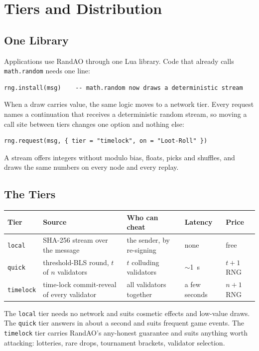 \section{Tiers and Distribution}\label{sec:tiers}

\subsection{One Library}\label{sec:library}
Applications use RandAO through one Lua library. Code that already calls \texttt{math.random} needs one line:
\begin{verbatim}
rng.install(msg)    -- math.random now draws a deterministic stream
\end{verbatim}
When a draw carries value, the same logic moves to a network tier. Every request names a continuation that receives a deterministic random stream, so moving a call site between tiers changes one option and nothing else:
\begin{verbatim}
rng.request(msg, { tier = "timelock", on = "Loot-Roll" })
\end{verbatim}
A stream offers integers without modulo bias, floats, picks and shuffles, and draws the same numbers on every node and every replay.

\subsection{The Tiers}\label{sec:tier_table}

\begin{center}
\begin{tabular}{p{2.2cm} p{4.2cm} p{3.6cm} p{1.8cm} p{1.4cm}}
\textbf{Tier} & \textbf{Source} & \textbf{Who can cheat} & \textbf{Latency} & \textbf{Price} \\
\hline
\texttt{local} & SHA-256 stream over the message & the sender, by re-signing & none & free \\
\texttt{quick} & threshold-BLS round, $t$ of $n$ validators & $t$ colluding validators & $\sim$1~s & $t+1$ RNG \\
\texttt{timelock} & time-lock commit-reveal of every validator & all validators together & a few seconds & $n+1$ RNG \\
\end{tabular}
\end{center}

The \texttt{local} tier needs no network and suits cosmetic effects and low-value draws. The \texttt{quick} tier answers in about a second and suits frequent game events. The \texttt{timelock} tier carries RandAO's any-honest guarantee and suits anything worth attacking: lotteries, rare drops, tournament brackets, validator selection.

